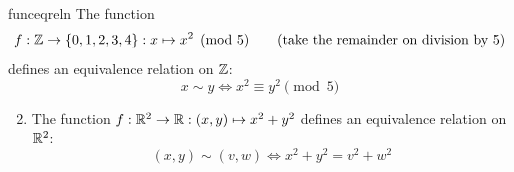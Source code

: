 \begin{examples}{}{funceqreln}
	\exstart The function
	\[
		f:\mathbb{Z}\to\{0,1,2,3,4\}:x\mapsto x^2\pmod 5 \tag{take the remainder on division by 5}
	\]
	defines an equivalence relation on $\mathbb{Z}$:
	\[
		x\sim y\iff x^2\equiv y^2\pmod 5
	\]
	\begin{enumerate}\setcounter{enumi}{1}
		\item\label{ex:equivcircle} The function $f:\mathbb{R}^2\to\mathbb{R}:(x,y)\mapsto x^2+y^2$ defines an equivalence relation\footnotemark{} on $\mathbb{R}^2$:
		\[
			(x,y)\sim(v,w)\iff x^2+y^2=v^2+w^2
\]
\end{enumerate}
\end{examples}
